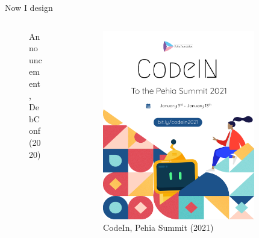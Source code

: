 \documentclass[presentation]{beamer}
\begin{document}
\begin{frame}[label={sec:orgaf4c7a7}]{Now I design}
\begin{columns}
\begin{column}{0.25\columnwidth}
\begin{figure}[htbp]
\caption{Announcement, DebConf (2020)}
\end{figure}
\end{column}
\begin{column}{0.25\columnwidth}
\begin{figure}[htbp]
\centering
\includegraphics[width=.9\linewidth]{././codein.png}
\caption{CodeIn, Pehia Summit (2021)}
\end{figure}
\end{column}
\begin{column}{0.25\columnwidth}
\begin{figure}[htbp]
\centering

\end{figure}
\end{column}
\end{columns}
\end{frame}
\end{document}
